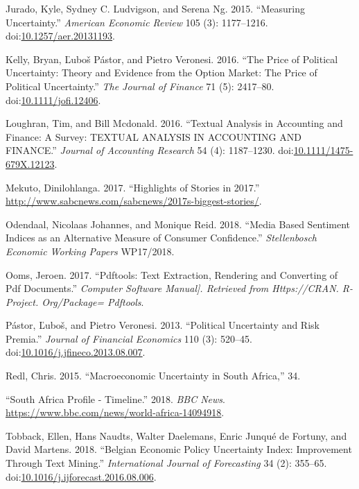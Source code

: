 \documentclass[11pt,preprint, authoryear]{elsarticle}
\numberwithin{equation}{section}
\numberwithin{figure}{section}
\numberwithin{table}{section}
\begin{document}
\hypertarget{ref-Jurado2015}{}
Jurado, Kyle, Sydney C. Ludvigson, and Serena Ng. 2015. ``Measuring
Uncertainty.'' \emph{American Economic Review} 105 (3): 1177--1216.
doi:\href{https://doi.org/10.1257/aer.20131193}{10.1257/aer.20131193}.

\hypertarget{ref-Kelly2016}{}
Kelly, Bryan, Ľuboš Pástor, and Pietro Veronesi. 2016. ``The Price of
Political Uncertainty: Theory and Evidence from the Option Market: The
Price of Political Uncertainty.'' \emph{The Journal of Finance} 71 (5):
2417--80.
doi:\href{https://doi.org/10.1111/jofi.12406}{10.1111/jofi.12406}.

\hypertarget{ref-Loughran2016}{}
Loughran, Tim, and Bill Mcdonald. 2016. ``Textual Analysis in Accounting
and Finance: A Survey: TEXTUAL ANALYSIS IN ACCOUNTING AND FINANCE.''
\emph{Journal of Accounting Research} 54 (4): 1187--1230.
doi:\href{https://doi.org/10.1111/1475-679X.12123}{10.1111/1475-679X.12123}.

\hypertarget{ref-Mekuto2017}{}
Mekuto, Dinilohlanga. 2017. ``Highlights of Stories in 2017.''
\url{http://www.sabcnews.com/sabcnews/2017s-biggest-stories/}.

\hypertarget{ref-Odendaal2018}{}
Odendaal, Nicolaas Johannes, and Monique Reid. 2018. ``Media Based
Sentiment Indices as an Alternative Measure of Consumer Confidence.''
\emph{Stellenbosch Economic Working Papers} WP17/2018.

\hypertarget{ref-Ooms2017}{}
Ooms, Jeroen. 2017. ``Pdftools: Text Extraction, Rendering and
Converting of Pdf Documents.'' \emph{Computer Software Manual{]}.
Retrieved from Https://CRAN. R-Project. Org/Package= Pdftools}.

\hypertarget{ref-Pastor2013}{}
Pástor, Ľuboš, and Pietro Veronesi. 2013. ``Political Uncertainty and
Risk Premia.'' \emph{Journal of Financial Economics} 110 (3): 520--45.
doi:\href{https://doi.org/10.1016/j.jfineco.2013.08.007}{10.1016/j.jfineco.2013.08.007}.

\hypertarget{ref-Redl2015}{}
Redl, Chris. 2015. ``Macroeconomic Uncertainty in South Africa,'' 34.

\hypertarget{ref-2018}{}
``South Africa Profile - Timeline.'' 2018. \emph{BBC News}.
\url{https://www.bbc.com/news/world-africa-14094918}.

\hypertarget{ref-Tobback2018}{}
Tobback, Ellen, Hans Naudts, Walter Daelemans, Enric Junqué de Fortuny,
and David Martens. 2018. ``Belgian Economic Policy Uncertainty Index:
Improvement Through Text Mining.'' \emph{International Journal of
Forecasting} 34 (2): 355--65.
doi:\href{https://doi.org/10.1016/j.ijforecast.2016.08.006}{10.1016/j.ijforecast.2016.08.006}.
\end{document}
